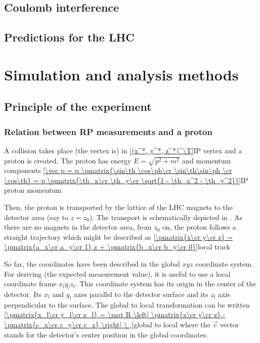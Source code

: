 
\section{Coulomb interference}

\section{Predictions for the LHC}


\chapter{Simulation and analysis methods}

\section{Principle of the experiment}

\subsection[rp measurement]{Relation between RP measurements and a proton}

A collision takes place (the vertex is) in
\eqref{(x^*, y^*, z^*)^\T}{IP vertex}
and a proton is created. The proton has energy $E=\sqrt{p^2 + m^2}$ and momentum components
\eqref{\vec p = p \pmatrix{\sin\th \cos\ph\cr \sin\th\sin\ph \cr \cos\th} = 
p \pmatrix{\th_x\cr \th_y\cr \sqrt{1 - \th_x^2 - \th_y^2}}}{IP proton momentum}


Then, the proton is transported by the lattice of the LHC magnets to the detector area (say to $z = z_0$). The transport is schematically depicted in . As there are no magnets in the detector area, from $z_0$ on, the proton follows a straight trajectory which might be described as
\eqref{\pmatrix{x\cr y\cr z} = \pmatrix{a_x\cr a_y\cr 1} z + \pmatrix{b_x\cr b_y\cr 0}}{local track}

So far, the coordinates have been described in the global $xyz$ coordinate system. For deriving (the expected measurement value), it is useful to use a local coordinate frame $x_l y_l z_l$. This coordinate system has its origin in the center of the detector. Its $x_l$ and $y_l$ axes parallel to the detector surface and its $z_l$ axis perpendicular to the surface. The global to local transformation can be written
\eqref{\pmatrix{x_l\cr y_l\cr z_l} = \mat R \left[ \pmatrix{x\cr y\cr z}  - \pmatrix{c_x\cr c_y\cr c_z}  \right] \ ,}{global to local}
where the $\vec c$ vector stands for the detector's center position in the global coordinates.

